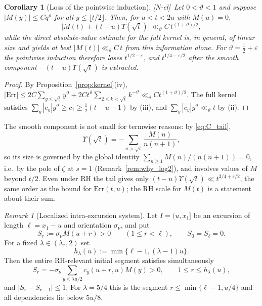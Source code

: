 \documentclass[11pt]{amsart}
\numberwithin{equation}{section}
\theoremstyle{plain}
\newtheorem{corollary}[theorem]{Corollary}
\theoremstyle{definition}
\theoremstyle{remark}
\newtheorem{remark}[theorem]{Remark}
\newcommand{\eps}{\varepsilon}
\newcommand{\tagNE}{\textup{[N-el]}}
\begin{document}
\begin{corollary}[Loss of the pointwise induction]
\label{cor:induction-loss}
\tagNE\ Let $0<\vartheta<1$ and suppose $|M(y)|\le Cq^\vartheta$ for all $y\le\lfloor t/2\rfloor$. Then,
for $u<t<2u$ with $M(u)=0$,
\begin{equation}
\label{eq:induction-loss}
\bigl|M(t)+(t-u)\Upsilon(\sqrt t)\bigr|\ll_\vartheta C\,t^{(1+\vartheta)/2},
\end{equation}
while the direct absolute-value estimate for the full kernel is, in general,
of linear size and yields at best $|M(t)|\ll_\vartheta C\,t$ from this
information alone. For $\vartheta=\frac12+\eps$ the pointwise induction
therefore loses $t^{1/2-\eps}$, and $t^{1/4-\eps/2}$ after the smooth
component $-(t-u)\Upsilon(\sqrt t)$ is extracted.
\end{corollary}

\begin{proof}
By Proposition~\ref{prop:kernel}(iv),
$|\mathrm{Err}|\le2C\sum_{y\le\sqrt t}y^\vartheta+2Ct^\vartheta\sum_{2\le k<\sqrt t}k^{-\vartheta}
\ll_\vartheta Ct^{(1+\vartheta)/2}$. The full kernel satisfies
$\sum_y|c_y|y^\vartheta\ge c_1\ge\frac12(t-u-1)$ by (iii), and
$\sum_y|c_y|y^\vartheta\ll_\vartheta t$ by (ii).
\end{proof}

The smooth component is not small for termwise reasons: by
\eqref{eq:C_tail},
\[
\Upsilon(\sqrt t)=-\sum_{n>\sqrt t}\frac{M(n)}{n(n+1)},
\]
so its size is governed by the global identity
$\sum_{n\ge1}M(n)/(n(n+1))=0$, i.e.\ by the pole of $\zeta$ at $s=1$
(Remark~\ref{rem:why_log2}), and involves values of $M$ beyond $t/2$. Even
under RH the tail gives only $(t-u)\Upsilon(\sqrt t)\ll t^{3/4+\eps/2}$, the
same order as the bound for $\mathrm{Err}(t,u)$; the RH scale for $M(t)$ is a statement
about their sum.

\begin{remark}[Localized intra-excursion system]
\label{rem:sign-cone}
Let $I=(u,x_1]$ be an excursion of length $\ell=x_1-u$ and orientation
$\sigma_\nu$, and put
\[
S_r:=\sigma_\nu M(u+r)>0\qquad(1\le r<\ell),\qquad S_0=S_\ell=0.
\]
For a fixed $\lambda\in(\lambda_*,2)$ set
\[
h_\lambda(u):=\min\{\ell-1,(\lambda-1)u\}.
\]
Then the entire RH-relevant initial segment satisfies simultaneously
\[
S_r=-\sigma_\nu\sum_{y\le\lambda u/2}c_y(u+r,u)M(y)>0,
\qquad1\le r\le h_\lambda(u),
\]
and $|S_r-S_{r-1}|\le1$.  For $\lambda=5/4$ this is the segment
$r\le\min\{\ell-1,u/4\}$ and all dependencies lie below $5u/8$.
\end{remark}
\end{document}
